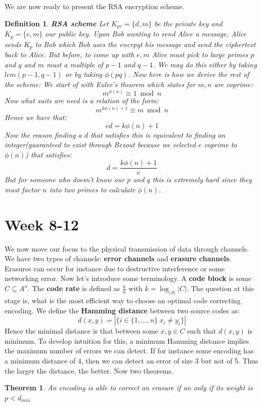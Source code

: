 \documentclass[titlepage]{article}
\newtheorem{theorem}{Theorem}[section]
\newtheorem{definition}{Definition}
\begin{document}
We are now ready to present the RSA encryption scheme.
\begin{definition}\textbf{RSA scheme}
Let $K_{pr} = \{d,m\}$ be the private key and $K_{p} = \{e,m\}$ our public key. Upon Bob wanting to send Alice a message, Alice sends $K_{p}$ to Bob which Bob uses the encrpyt his message and send the ciphertext back to Alice. But before, to come up with $e,m$ Alice must pick to large primes $p$ and $q$ and $m$ must a multiple of $p-1$ and $q-1$. We may do this either by taking $lcm(p-1,q-1)$ or by taking $\phi(pq)$. Now here is how we derive the rest of the scheme:
We start of with Euler's theorem which states for $m,n$ are coprime:
$$m^{\phi(n)} \equiv 1 \bmod{n}$$
Now what suits are need is a relation of the form:
$$m^{k\phi(n) + 1} \equiv m \bmod{n}$$
Hence we have that:
$$ed = k\phi(n)+1$$
Now the reason finding a $d$ that satisfies this is equivalent to finding an integer(guaranteed to exist through Bezout because we selected $e$ coprime to $\phi(n)$) that satisfies:
$$d = \frac{k\phi(n)+1}{e}$$
But for someone who doesn't know our $p$ and $q$ this is extremely hard since they must factor $n$ into two primes to calculate $\phi(n)$. 
\end{definition}


\section{Week 8-12}
We now move our focus to the physical transmission of data through channels. We have two types of channels: \textbf{error channels} and \textbf{erasure channels}. Erasures can occur for instance due to destructive interference or some networking error. Now let's introduce some terminology. A \textbf{code block} is some $C \subseteq A^{n}$. The \textbf{code rate} is defined as $\frac{k}{n}$ with $k = \log_{|A|}{|C|}$. The question at this stage is, what is the most efficient way to choose an optimal code correcting encoding. We define the \textbf{Hamming distance} between two source codes as:
$$d(x,y) = |\{i \in \{1,\ldots,n\} \ x_{i} \not = y_{i} \}|$$
Hence the minimal distance is that between some $x,y \in C$ such that $d(x,y)$ is minimum. To develop intuition for this, a minimum Hamming distance implies the maximum number of errors we can detect. If for instance some encoding has a minimum distance of $4$, then we can detect an error of size 3 but not of 5. Thus the larger the distance, the better. Now two theorems.

\begin{theorem}
An encoding is able to correct an erasure if an only if its weight is $p < d_{min}$
\end{theorem}
\end{document}
